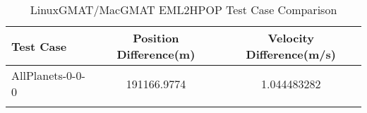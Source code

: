 \begin{table}[htbp!]
\centering
\caption{ LinuxGMAT/MacGMAT EML2HPOP Test Case Comparison}
      \begin{tabular}{lcc}
      \hline\hline
          Test Case & Position Difference(m) & Velocity Difference(m/s) \\
         \hline
         AllPlanets-0-0-0 & 191166.9774 & 1.044483282 \\
      \hline\hline
      \label{Table: EML2HPOP LinuxGMAT-MacGMAT Table} 
\end{tabular}
\end{table}
